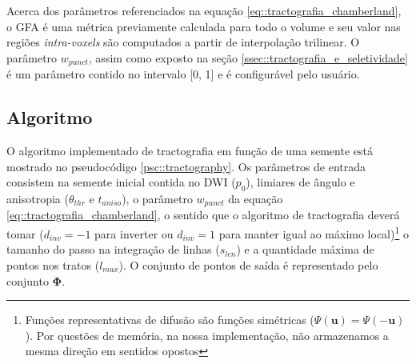 \documentclass[
    12pt,                %
    oneside,            %
    a4paper,            %
    english,            %
    french,                %
    spanish,            %
    brazil                %
    ]{abntex2}
\begin{document}




Acerca dos parâmetros referenciados na equação \ref{eq::tractografia_chamberland}, o GFA é uma métrica previamente calculada para todo o volume e seu valor nas regiões \textit{intra-voxels} são computados a partir de interpolação trilinear. O parâmetro $w_{punct}$, assim como exposto na seção \ref{ssec::tractografia_e_seletividade} é um parâmetro contido no intervalo [0, 1] e é configurável pelo usuário.

\subsection{Algoritmo}

O algoritmo implementado de tractografia em função de uma semente está mostrado no pseudocódigo \ref{psc::tractography}. Os parâmetros de entrada consistem na semente inicial contida no DWI ($p_0$), limiares de ângulo e anisotropia ($\theta_{thr}$ e $t_{aniso}$), o parâmetro $w_{punct}$ da equação \ref{eq::tractografia_chamberland}, o sentido que o algoritmo de tractografia deverá tomar ($d_{inv} = -1$ para inverter ou $d_{inv} = 1$ para manter igual ao máximo local)\footnote{Funções representativas de difusão são funções simétricas ($\Psi(\mathbf{u}) = \Psi(\mathbf{-u})$). Por questões de memória, na nossa implementação, não armazenamos a mesma direção em sentidos opostos}  o tamanho do passo na integração de linhas ($s_{len}$) e a quantidade máxima de pontos nos tratos ($l_{max}$). O conjunto de pontos de saída é representado pelo conjunto $\mathbf{\Phi}$.
\end{document}
